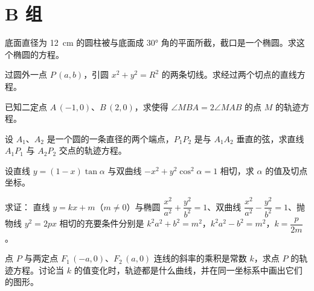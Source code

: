 \section*{B 组}
\begin{question}[resume]
  \item 底面直径为 \qty{12}{cm} 的圆柱被与底面成 \ang{30} 角的平面所截，截口是一个椭圆。求这个椭圆的方程。
  \item 过圆外一点 $P\,(a,b)$，引圆 $x^2+y^2=R^2$ 的两条切线。求经过两个切点的直线方程。
  \item 已知二定点 $A\,(-1,0)$、$B\,(2,0)$，求使得 $\angle MBA= 2\angle MAB$ 的点 $M$ 的轨迹方程。
  \item 设 $A_1$、$A_2$ 是一个圆的一条直径的两个端点，$P_1P_2$ 是与 $A_1A_2$ 垂直的弦，求直线 $A_1P_1$ 与 $A_2P_2$ 交点的轨迹方程。
  \item 设直线 $y=(1-x)\tan\alpha$ 与双曲线 $-x^2+y^2\cos^2\alpha=1$ 相切，求 $\alpha$ 的值及切点坐标。
  \item 求证： 直线 $y=kx+m$（$m\neq 0$）与椭圆 $\dfrac{x^2}{a^2}+\dfrac{y^2}{b^2}=1$、双曲线 $\dfrac{x^2}{a^2}-\dfrac{y^2}{b^2}=1$、抛物线 $y^2=2px$ 相切的充要条件分别是 $k^2a^2+b^2=m^2$，$k^2a^2-b^2=m^2$，$k=\dfrac{p}{2m}$。
  \item 点 $P$ 与两定点 $F_1\,(-a,0)$、$F_2\,(a,0)$ 连线的斜率的乘积是常数 $k$，求点 $P$ 的轨迹方程。讨论当 $k$ 的值变化时，轨迹都是什么曲线，并在同一坐标系中画出它们的图形。
\end{question}